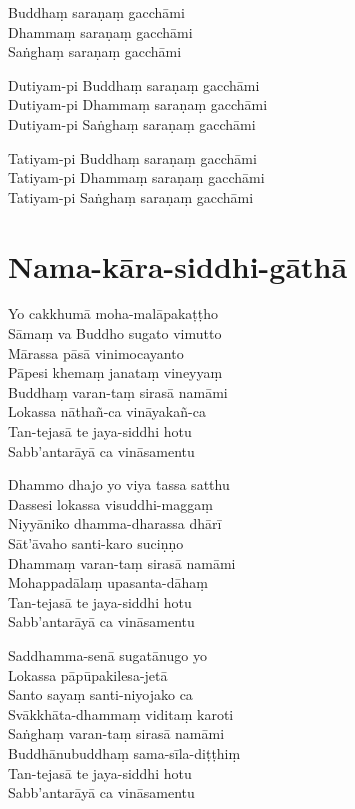 \begin{paritta}
Buddhaṃ saraṇaṃ gacchāmi\\
Dhammaṃ saraṇaṃ gacchāmi\\
Saṅghaṃ saraṇaṃ gacchāmi

Dutiyam-pi Buddhaṃ saraṇaṃ gacchāmi\\
Dutiyam-pi Dhammaṃ saraṇaṃ gacchāmi\\
Dutiyam-pi Saṅghaṃ saraṇaṃ gacchāmi

Tatiyam-pi Buddhaṃ saraṇaṃ gacchāmi\\
Tatiyam-pi Dhammaṃ saraṇaṃ gacchāmi\\
Tatiyam-pi Saṅghaṃ saraṇaṃ gacchāmi
\end{paritta}

\chapter{Nama-kāra-siddhi-gāthā}%

\begin{paritta}
Yo cakkhumā moha-malāpakaṭṭho\\
Sāmaṃ va Buddho sugato vimutto\\
Mārassa pāsā vinimocayanto\\
Pāpesi khemaṃ janataṃ vineyyaṃ\\
Buddhaṃ varan-taṃ sirasā namāmi\\
Lokassa nāthañ-ca vināyakañ-ca\\
Tan-tejasā te jaya-siddhi hotu\\
Sabb'antarāyā ca vināsamentu

Dhammo dhajo yo viya tassa satthu\\
Dassesi lokassa visuddhi-maggaṃ\\
Niyyāniko dhamma-dharassa dhārī\\
Sāt'āvaho santi-karo suciṇṇo\\
Dhammaṃ varan-taṃ sirasā namāmi\\
Mohappadālaṃ upasanta-dāhaṃ\\
Tan-tejasā te jaya-siddhi hotu\\
Sabb'antarāyā ca vināsamentu

Saddhamma-senā sugatānugo yo\\
Lokassa pāpūpakilesa-jetā\\
Santo sayaṃ santi-niyojako ca\\
Svākkhāta-dhammaṃ viditaṃ karoti\\
Saṅghaṃ varan-taṃ sirasā namāmi\\
Buddhānubuddhaṃ sama-sīla-diṭṭhiṃ\\
Tan-tejasā te jaya-siddhi hotu\\
Sabb'antarāyā ca vināsamentu
\end{paritta}


